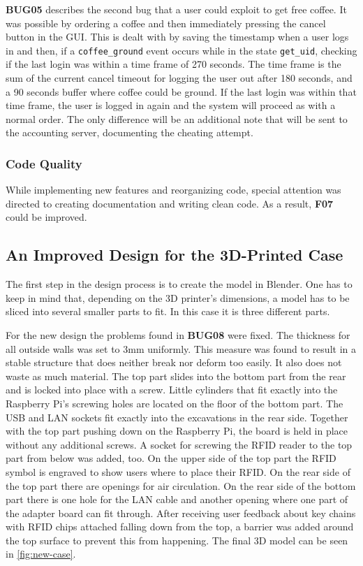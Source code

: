 \documentclass[12pt]{article}
\begin{document}
\textbf{BUG05} describes the second bug that a user could exploit to get free coffee. 
It was possible by ordering a coffee and then immediately pressing the cancel button in the GUI.
This is dealt with by saving the timestamp when a user logs in and then, if a \texttt{coffee\_ground} event occurs while in the state \texttt{get\_uid},
checking if the last login was within a time frame of 270 seconds.
The time frame is the sum of the current cancel timeout for logging the user out after 180 seconds, 
and a 90 seconds buffer where coffee could be ground.
If the last login was within that time frame, the user is logged in again and the system will proceed as with a normal order.
The only difference will be an additional note that will be sent to the accounting
server, documenting the cheating attempt.

\subsubsection{Code Quality}
While implementing new features and reorganizing code, 
special attention was directed to creating documentation
and writing clean code.
As a result, \textbf{F07} could be improved.

\subsection{An Improved Design for the 3D-Printed Case}
The first step in the design process is to create the model in Blender.
One has to keep in mind that, depending on the 3D printer's dimensions,
a model has to be sliced into several smaller parts to fit.
In this case it is three different parts.

For the new design the problems found in \textbf{BUG08} were fixed.
The thickness for all outside walls was set to 3mm uniformly.
This measure was found to result in a stable structure
that does neither break nor deform too easily. It also does not waste as much material.
The top part slides into the bottom part from the rear and is locked into place with a screw.
Little cylinders that fit exactly into the Raspberry Pi's screwing holes
are located on the floor of the bottom part.
The USB and LAN sockets fit exactly into the excavations in the rear side.
Together with the top part pushing down on the Raspberry Pi, the board is held in place without any additional screws.
A socket for screwing the RFID reader to the top part from below was added, too.
On the upper side of the top part the RFID symbol is engraved to show users where to place their RFID.
On the rear side of the top part there are openings for air circulation.
On the rear side of the bottom part there is one hole for the LAN cable and another 
opening where one part of the adapter board can fit through. 
After receiving user feedback about key chains with RFID chips attached falling down from the top,
a barrier was added around the top surface to prevent this from happening.
The final 3D model can be seen in \autoref{fig:new-case}.
\end{document}
